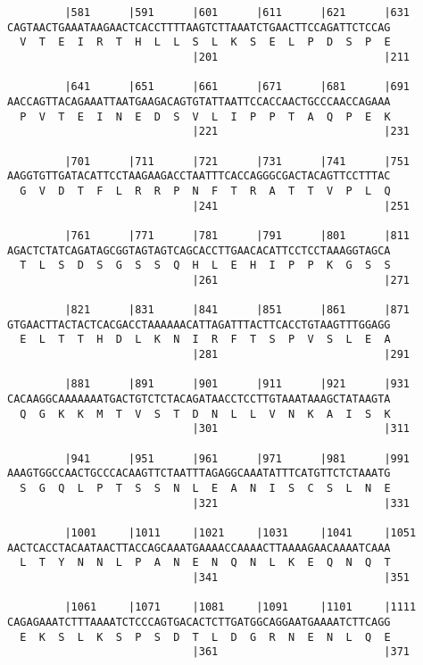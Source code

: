 \documentclass{article}
\begin{document}
\begin{Verbatim}
         |581      |591      |601      |611      |621      |631
CAGTAACTGAAATAAGAACTCACCTTTTAAGTCTTAAATCTGAACTTCCAGATTCTCCAG
  V  T  E  I  R  T  H  L  L  S  L  K  S  E  L  P  D  S  P  E
                             |201                          |211
  
         |641      |651      |661      |671      |681      |691
AACCAGTTACAGAAATTAATGAAGACAGTGTATTAATTCCACCAACTGCCCAACCAGAAA
  P  V  T  E  I  N  E  D  S  V  L  I  P  P  T  A  Q  P  E  K
                             |221                          |231
  
         |701      |711      |721      |731      |741      |751
AAGGTGTTGATACATTCCTAAGAAGACCTAATTTCACCAGGGCGACTACAGTTCCTTTAC
  G  V  D  T  F  L  R  R  P  N  F  T  R  A  T  T  V  P  L  Q
                             |241                          |251
  
         |761      |771      |781      |791      |801      |811
AGACTCTATCAGATAGCGGTAGTAGTCAGCACCTTGAACACATTCCTCCTAAAGGTAGCA
  T  L  S  D  S  G  S  S  Q  H  L  E  H  I  P  P  K  G  S  S
                             |261                          |271
  
         |821      |831      |841      |851      |861      |871
GTGAACTTACTACTCACGACCTAAAAAACATTAGATTTACTTCACCTGTAAGTTTGGAGG
  E  L  T  T  H  D  L  K  N  I  R  F  T  S  P  V  S  L  E  A
                             |281                          |291
  
         |881      |891      |901      |911      |921      |931
CACAAGGCAAAAAAATGACTGTCTCTACAGATAACCTCCTTGTAAATAAAGCTATAAGTA
  Q  G  K  K  M  T  V  S  T  D  N  L  L  V  N  K  A  I  S  K
                             |301                          |311
  
         |941      |951      |961      |971      |981      |991
AAAGTGGCCAACTGCCCACAAGTTCTAATTTAGAGGCAAATATTTCATGTTCTCTAAATG
  S  G  Q  L  P  T  S  S  N  L  E  A  N  I  S  C  S  L  N  E
                             |321                          |331
  
         |1001     |1011     |1021     |1031     |1041     |1051
AACTCACCTACAATAACTTACCAGCAAATGAAAACCAAAACTTAAAAGAACAAAATCAAA
  L  T  Y  N  N  L  P  A  N  E  N  Q  N  L  K  E  Q  N  Q  T
                             |341                          |351
  
         |1061     |1071     |1081     |1091     |1101     |1111
CAGAGAAATCTTTAAAATCTCCCAGTGACACTCTTGATGGCAGGAATGAAAATCTTCAGG
  E  K  S  L  K  S  P  S  D  T  L  D  G  R  N  E  N  L  Q  E
                             |361                          |371
  

\end{Verbatim}
\end{document}
